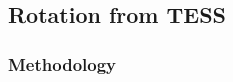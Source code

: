 \documentclass[12pt,twocolumn,tighten]{aastex63}
\newcommand{\cn}{NGC\,2516} %
\newcommand{\bpmrpo}{(G_{\rm BP}-G_{\rm RP})_0}
\begin{document}
\subsection{Rotation from TESS}
\label{subsec:tess}

\subsubsection{Methodology}
\label{subsubsec:cluster}

% 
\end{document}
